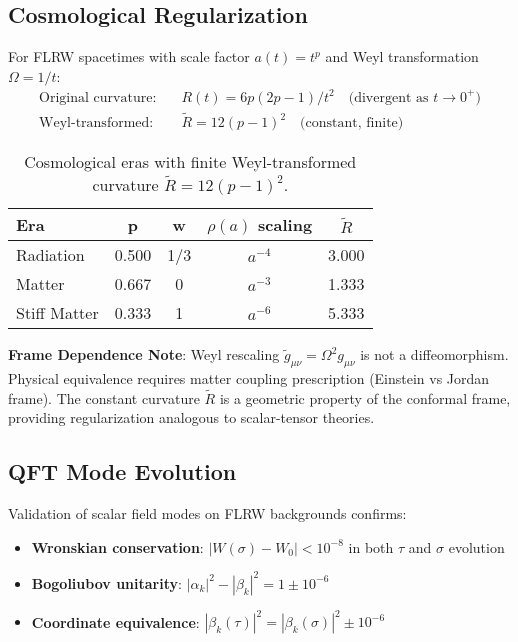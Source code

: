 \documentclass[11pt]{article}
\begin{document}
\subsection{Cosmological Regularization}
For FLRW spacetimes with scale factor $a(t) = t^p$ and Weyl transformation $\Omega = 1/t$:
\begin{align}
\text{Original curvature:} \quad &R(t) = 6p(2p-1)/t^2 \quad \text{(divergent as } t \to 0^+\text{)} \\
\text{Weyl-transformed:} \quad &\tilde{R} = 12(p-1)^2 \quad \text{(constant, finite)}
\end{align}

\begin{table}[h]
\centering
\begin{tabular}{|l|c|c|c|c|}
\hline
\textbf{Era} & \textbf{p} & \textbf{w} & \textbf{$\rho(a)$ scaling} & \textbf{$\tilde{R}$} \\
\hline
Radiation & 0.500 & 1/3 & $a^{-4}$ & 3.000 \\
Matter & 0.667 & 0 & $a^{-3}$ & 1.333 \\
Stiff Matter & 0.333 & 1 & $a^{-6}$ & 5.333 \\
\hline
\end{tabular}
\caption{Cosmological eras with finite Weyl-transformed curvature $\tilde{R} = 12(p-1)^2$.}
\end{table}

\textbf{Frame Dependence Note}: Weyl rescaling $\tilde{g}_{\mu\nu} = \Omega^2 g_{\mu\nu}$ is not a diffeomorphism. Physical equivalence requires matter coupling prescription (Einstein vs Jordan frame). The constant curvature $\tilde{R}$ is a geometric property of the conformal frame, providing regularization analogous to scalar-tensor theories.

\subsection{QFT Mode Evolution}
Validation of scalar field modes on FLRW backgrounds confirms:
\begin{itemize}
\item \textbf{Wronskian conservation}: $|W(\sigma) - W_0| < 10^{-8}$ in both $\tau$ and $\sigma$ evolution
\item \textbf{Bogoliubov unitarity}: $|\alpha_k|^2 - |\beta_k|^2 = 1 \pm 10^{-6}$ 
\item \textbf{Coordinate equivalence}: $|\beta_k(\tau)|^2 = |\beta_k(\sigma)|^2 \pm 10^{-6}$
\end{itemize}
\end{document}
